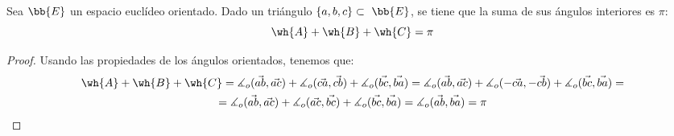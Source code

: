 \begin{teo}
    Sea $\bb{E}$ un espacio euclídeo orientado. Dado un triángulo $\{a,b,c\}\subset~\bb{E}$, se tiene que la suma de sus ángulos interiores es $\pi$:
    \begin{equation*}
        \wh{A} + \wh{B} + \wh{C} = \pi
    \end{equation*}    
    \begin{figure}[H]
        \centering
    \end{figure}
\end{teo}
\begin{proof} Usando las propiedades de los ángulos orientados, tenemos que:
\begin{multline*}
    \wh{A} + \wh{B} + \wh{C}
    = \measuredangle_o (\vec{ab}, \vec{ac})+ \measuredangle_o (\vec{ca}, \vec{cb}) + \measuredangle_o (\vec{bc}, \vec{ba})
    = \measuredangle_o (\vec{ab}, \vec{ac})+ \measuredangle_o (-\vec{ca}, -\vec{cb}) + \measuredangle_o (\vec{bc}, \vec{ba}) =\\
    = \measuredangle_o (\vec{ab}, \vec{ac})+ \measuredangle_o (\vec{ac}, \vec{bc}) + \measuredangle_o (\vec{bc}, \vec{ba}) = \measuredangle_o (\vec{ab}, \vec{ba}) = \pi
\end{multline*}
\end{proof}


